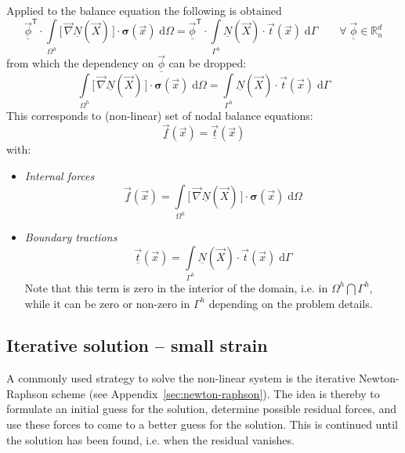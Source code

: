 \documentclass[times,namecite]{goose-article}
\begin{document}
Applied to the balance equation the following is obtained
\begin{equation}
  \underline{\vec{\phi}}^\mathsf{T} \cdot
  \int\limits_{\Omega^h}
    \big[\, \vec{\nabla} \underline{N}(\vec{X}) \,\big]
    \cdot
    \bm{\sigma}(\vec{x}) \;
  \mathrm{d}\Omega
  =
  \underline{\vec{\phi}}^\mathsf{T} \cdot
  \int\limits_{\Gamma^h}
    \underline{N}(\vec{X}) \cdot
    \vec{t}(\vec{x}) \;
  \mathrm{d}\Gamma
  \qquad
  \forall \; \underline{\vec{\phi}} \in \mathbb{R}^d_n
\end{equation}
from which the dependency on $\underline{\vec{\phi}}$ can be dropped:
\begin{equation}
  \int\limits_{\Omega^h}
    \big[\, \vec{\nabla} \underline{N}(\vec{X}) \,\big]
    \cdot
    \bm{\sigma}(\vec{x}) \;
  \mathrm{d}\Omega
  =
  \int\limits_{\Gamma^h}
    \underline{N}(\vec{X}) \cdot
    \vec{t}(\vec{x}) \;
  \mathrm{d}\Gamma
\end{equation}
This corresponds to (non-linear) set of nodal balance equations:
\begin{equation}
  \underline{\vec{f}}(\vec{x})
  =
  \underline{\vec{t}}(\vec{x})
\end{equation}
with:
\begin{itemize}
  \item \emph{Internal forces}
  \begin{equation}
    \underline{\vec{f}}(\vec{x})
    =
    \int\limits_{\Omega^h}
      \big[\, \vec{\nabla} \underline{N}(\vec{X}) \,\big]
      \cdot
      \bm{\sigma}(\vec{x}) \;
    \mathrm{d}\Omega
  \end{equation}
  \item \emph{Boundary tractions}
  \begin{equation}
    \underline{\vec{t}}(\vec{x})
    =
    \int\limits_{\Gamma^h}
      \underline{N}(\vec{X}) \cdot
      \vec{t}(\vec{x}) \;
    \mathrm{d}\Gamma
  \end{equation}
  Note that this term is zero in the interior of the domain, i.e. in $\Omega^h \bigcap \Gamma^h$, while it can be zero or non-zero in $\Gamma^h$ depending on the problem details.
\end{itemize}

\subsection{Iterative solution -- small strain}

A commonly used strategy to solve the non-linear system is the iterative Newton-Raphson scheme (see Appendix~\ref{sec:newton-raphson}). The idea is thereby to formulate an initial guess for the solution, determine possible residual forces, and use these forces to come to a better guess for the solution. This is continued until the solution has been found, i.e. when the residual vanishes.
\end{document}
